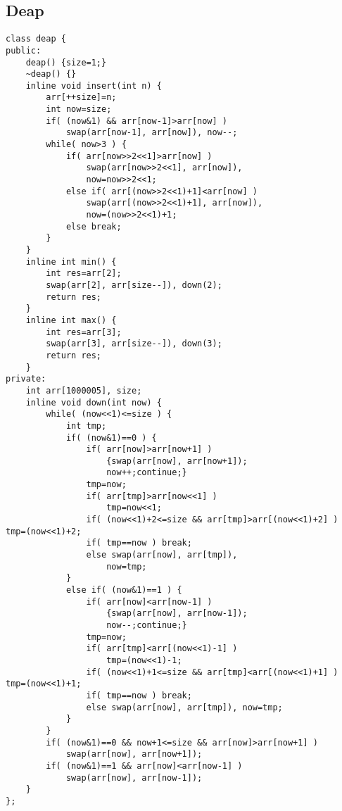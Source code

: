\documentclass[11pt,twocolumn,a4paper]{article}
\begin{document}
\subsection{Deap}
\begin{lstlisting}[label=Deap]
class deap {
public:
	deap() {size=1;}
	~deap() {}
	inline void insert(int n) {
		arr[++size]=n;
		int now=size;
		if( (now&1) && arr[now-1]>arr[now] )
			swap(arr[now-1], arr[now]), now--;
		while( now>3 ) {
			if( arr[now>>2<<1]>arr[now] )
				swap(arr[now>>2<<1], arr[now]),
				now=now>>2<<1;
			else if( arr[(now>>2<<1)+1]<arr[now] )
				swap(arr[(now>>2<<1)+1], arr[now]),
				now=(now>>2<<1)+1;
			else break;
		}
	}
	inline int min() {
		int res=arr[2];
		swap(arr[2], arr[size--]), down(2);
		return res;
	}
	inline int max() {
		int res=arr[3];
		swap(arr[3], arr[size--]), down(3);
		return res;
	}
private:
	int arr[1000005], size;
	inline void down(int now) {
		while( (now<<1)<=size ) {
			int tmp;
			if( (now&1)==0 ) {
				if( arr[now]>arr[now+1] )
					{swap(arr[now], arr[now+1]);
					now++;continue;}
				tmp=now;
				if( arr[tmp]>arr[now<<1] )
					tmp=now<<1;
				if( (now<<1)+2<=size && arr[tmp]>arr[(now<<1)+2] ) tmp=(now<<1)+2;
				if( tmp==now ) break;
				else swap(arr[now], arr[tmp]),
					now=tmp;
			}
			else if( (now&1)==1 ) {
				if( arr[now]<arr[now-1] )
					{swap(arr[now], arr[now-1]);
					now--;continue;}
				tmp=now;	
				if( arr[tmp]<arr[(now<<1)-1] )
					tmp=(now<<1)-1;
				if( (now<<1)+1<=size && arr[tmp]<arr[(now<<1)+1] ) tmp=(now<<1)+1;
				if( tmp==now ) break;
				else swap(arr[now], arr[tmp]), now=tmp;
			}
		}
		if( (now&1)==0 && now+1<=size && arr[now]>arr[now+1] )
			swap(arr[now], arr[now+1]);
		if( (now&1)==1 && arr[now]<arr[now-1] )
			swap(arr[now], arr[now-1]);
	}
};
\end{lstlisting}
\end{document}

